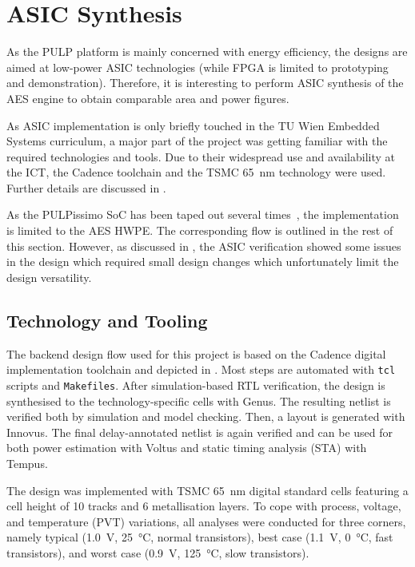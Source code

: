 \documentclass[a4paper, 12pt]{article}
\begin{document}
\pagebreak
\section{ASIC Synthesis} \label{sec:asic}

As the PULP platform is mainly concerned with energy efficiency, the designs are aimed at low-power ASIC technologies (while FPGA is limited to prototyping and demonstration). Therefore, it is interesting to perform ASIC synthesis of the AES engine to obtain comparable area and power figures.

As ASIC implementation is only briefly touched in the TU Wien Embedded Systems curriculum, a major part of the project was getting familiar with the required technologies and tools. Due to their widespread use and availability at the ICT, the Cadence toolchain and the TSMC \SI{65}{nm} technology were used. Further details are discussed in .

As the PULPissimo SoC has been taped out several times~\cite{pulp-chips}, the implementation is limited to the AES HWPE. The corresponding flow is outlined in the rest of this section. However, as discussed in , the ASIC verification showed some issues in the design which required small design changes which unfortunately limit the design versatility.

\subsection{Technology and Tooling} \label{sec:asic:tools}

The backend design flow used for this project is based on the Cadence digital implementation toolchain and depicted in . Most steps are automated with \texttt{tcl} scripts and \texttt{Makefiles}. After simulation-based RTL verification, the design is synthesised to the technology-specific cells with Genus. The resulting netlist is verified both by simulation and model checking. Then, a layout is generated with Innovus. The final delay-annotated netlist is again verified and can be used for both power estimation with Voltus and static timing analysis (STA) with Tempus.

The design was implemented with TSMC \SI{65}{nm} digital standard cells featuring a cell height of 10 tracks and 6 metallisation layers. To cope with process, voltage, and temperature (PVT) variations, all analyses were conducted for three corners, namely typical (\SI{1.0}{V}, \SI{25}{\degreeCelsius}, normal transistors), best case (\SI{1.1}{V}, \SI{0}{\degreeCelsius}, fast transistors), and worst case (\SI{0.9}{V}, \SI{125}{\degreeCelsius}, slow transistors).
\end{document}
